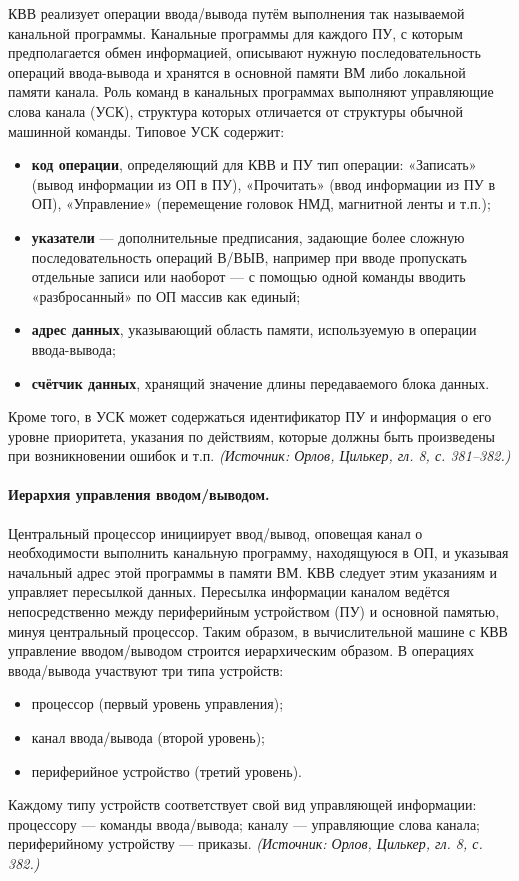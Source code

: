 \documentclass[a4paper,12pt]{article}
\begin{document}
КВВ реализует операции ввода/вывода путём выполнения так называемой канальной программы. Канальные программы для каждого ПУ, с которым предполагается обмен информацией, описывают нужную последовательность операций ввода-вывода и хранятся в основной памяти ВМ либо локальной памяти канала. Роль команд в канальных программах выполняют управляющие слова канала (УСК), структура которых отличается от структуры обычной машинной команды. Типовое УСК содержит:
\begin{itemize}
\item \textbf{код операции}, определяющий для КВВ и ПУ тип операции: «Записать» (вывод информации из ОП в ПУ), «Прочитать» (ввод информации из ПУ в ОП), «Управление» (перемещение головок НМД, магнитной ленты и т.п.);
\item \textbf{указатели} — дополнительные предписания, задающие более сложную последовательность операций В/ВЫВ, например при вводе пропускать отдельные записи или наоборот — с помощью одной команды вводить «разбросанный» по ОП массив как единый;
\item \textbf{адрес данных}, указывающий область памяти, используемую в операции ввода-вывода;
\item \textbf{счётчик данных}, хранящий значение длины передаваемого блока данных.
\end{itemize}
Кроме того, в УСК может содержаться идентификатор ПУ и информация о его уровне приоритета, указания по действиям, которые должны быть произведены при возникновении ошибок и т.п.
\textit{(Источник: Орлов, Цилькер, гл. 8, с. 381--382.)}

\paragraph{Иерархия управления вводом/выводом.}
Центральный процессор инициирует ввод/вывод, оповещая канал о необходимости выполнить канальную программу, находящуюся в ОП, и указывая начальный адрес этой программы в памяти ВМ. КВВ следует этим указаниям и управляет пересылкой данных. Пересылка информации каналом ведётся непосредственно между периферийным устройством (ПУ) и основной памятью, минуя центральный процессор. Таким образом, в вычислительной машине с КВВ управление вводом/выводом строится иерархическим образом. В операциях ввода/вывода участвуют три типа устройств:
\begin{itemize}
\item процессор (первый уровень управления);
\item канал ввода/вывода (второй уровень);
\item периферийное устройство (третий уровень).
\end{itemize}
Каждому типу устройств соответствует свой вид управляющей информации: процессору — команды ввода/вывода; каналу — управляющие слова канала; периферийному устройству — приказы.
\textit{(Источник: Орлов, Цилькер, гл. 8, с. 382.)}
\end{document}

